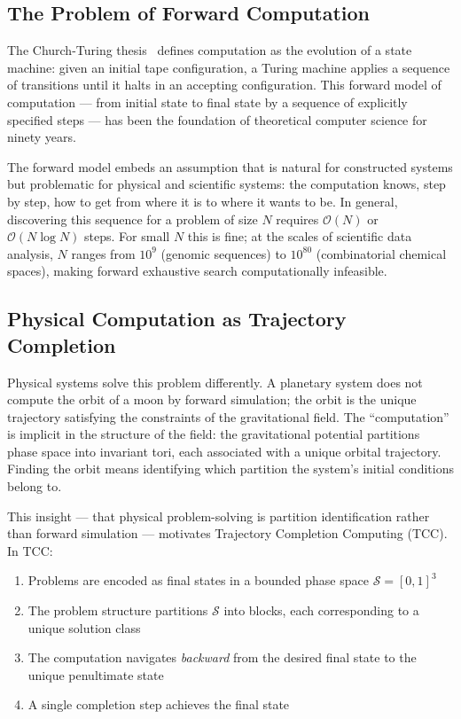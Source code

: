 \documentclass[12pt,twocolumn]{article}
\begin{document}
\subsection{The Problem of Forward Computation}

The Church-Turing thesis~\cite{turing1936computable,church1941calculi} defines computation as the evolution of a state machine: given an initial tape configuration, a Turing machine applies a sequence of transitions until it halts in an accepting configuration. This forward model of computation --- from initial state to final state by a sequence of explicitly specified steps --- has been the foundation of theoretical computer science for ninety years.

The forward model embeds an assumption that is natural for constructed systems but problematic for physical and scientific systems: the computation knows, step by step, how to get from where it is to where it wants to be. In general, discovering this sequence for a problem of size $N$ requires $\mathcal{O}(N)$ or $\mathcal{O}(N \log N)$ steps. For small $N$ this is fine; at the scales of scientific data analysis, $N$ ranges from $10^9$ (genomic sequences) to $10^{80}$ (combinatorial chemical spaces), making forward exhaustive search computationally infeasible.

\subsection{Physical Computation as Trajectory Completion}

Physical systems solve this problem differently. A planetary system does not compute the orbit of a moon by forward simulation; the orbit is the unique trajectory satisfying the constraints of the gravitational field. The ``computation'' is implicit in the structure of the field: the gravitational potential partitions phase space into invariant tori, each associated with a unique orbital trajectory. Finding the orbit means identifying which partition the system's initial conditions belong to.

This insight --- that physical problem-solving is partition identification rather than forward simulation --- motivates Trajectory Completion Computing (TCC). In TCC:

\begin{enumerate}
\item Problems are encoded as final states in a bounded phase space $\mathcal{S} = [0,1]^3$
\item The problem structure partitions $\mathcal{S}$ into blocks, each corresponding to a unique solution class
\item The computation navigates \emph{backward} from the desired final state to the unique penultimate state
\item A single completion step achieves the final state
\end{enumerate}
\end{document}
